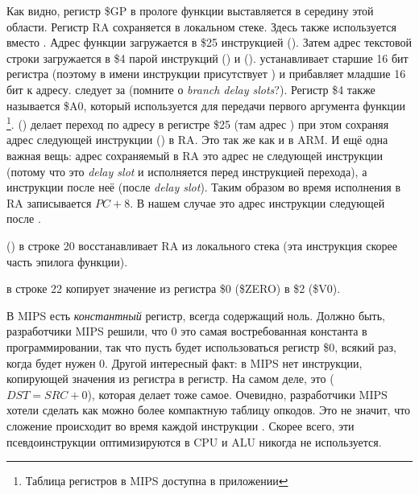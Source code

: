 

Как видно, регистр \$GP в прологе функции выставляется в середину этой области.
Регистр \ac{RA} сохраняется в локальном стеке.
Здесь также используется \puts вместо \printf.
Адрес функции \puts загружается в \$25 инструкцией  ().
Затем адрес текстовой строки загружается в \$4 парой инструкций  () и
 ().
 устанавливает старшие 16 бит регистра (поэтому в имени инструкции присутствует ) и 
прибавляет младшие 16 бит к адресу.
 следует за  (помните о \emph{branch delay slots}?).
Регистр \$4 также называется \$A0, который используется для передачи первого аргумента функции
\footnote{Таблица регистров в MIPS доступна в приложении }.
 () делает переход по адресу в регистре \$25 (там адрес \puts) 
при этом сохраняя адрес следующей инструкции () в \ac{RA}.
Это так же как и в ARM.
И ещё одна важная вещь: адрес сохраняемый в \ac{RA} это адрес не следующей инструкции (потому что
это \emph{delay slot} и исполняется перед инструкцией перехода),
а инструкции после неё (после \emph{delay slot}).
Таким образом во время исполнения  в \ac{RA} записывается $PC + 8$.
В нашем случае это адрес инструкции  следующей после .

 () в строке 20 восстанавливает \ac{RA} из локального стека (эта инструкция скорее часть эпилога функции).

 в строке 22 копирует значение из регистра \$0 (\$ZERO) в \$2 (\$V0).

\label{MIPS_zero_register}
В MIPS есть \emph{константный} регистр, всегда содержащий ноль.
Должно быть, разработчики MIPS решили, что 0 это самая востребованная константа в программировании,
так что пусть будет использоваться регистр \$0, всякий раз, когда будет нужен 0.
Другой интересный факт: в MIPS нет инструкции, копирующей значения из регистра в регистр.
На самом деле,  это  ($DST=SRC+0$), которая делает тоже самое.
Очевидно, разработчики MIPS хотели сделать как можно более компактную таблицу опкодов.
Это не значит, что сложение происходит во время каждой инструкции .
Скорее всего, эти псевдоинструкции оптимизируются в \ac{CPU} и \ac{ALU} никогда не используется.

